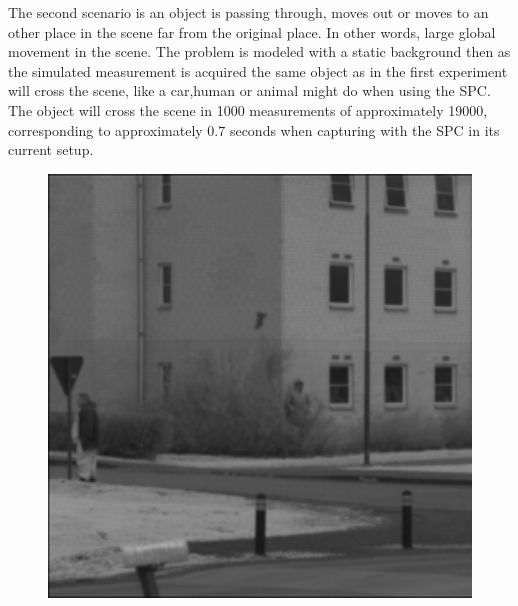
The second scenario is an object is passing through, moves out or moves to an other place in the scene far from the original place. In other words, large global movement in the scene. The problem is modeled with a static background then as the simulated measurement is acquired the same object as in the first experiment will cross the scene, like a car,human or animal might do when using the SPC. The object will cross the scene in 1000 measurements of approximately 19000, corresponding to approximately $0.7$ seconds when capturing with the SPC in its current setup.



\begin{figure}[H]
    \centering
\begin{minipage}[t]{0.32\textwidth}
    \includegraphics[width=1\textwidth]{result/dynamic/fly/flyby_1sec_org.png}
    \label{fig:fly_1}
\end{minipage}
\begin{minipage}[t]{0.32\textwidth}

\end{minipage}
\end{figure}
